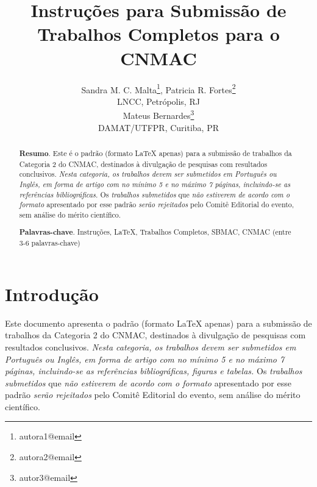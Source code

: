 \documentclass{pssbmac}
\begin{document}

\title{Instruções para Submissão de Trabalhos Completos para o CNMAC}

\author{
    {\large Sandra M. C. Malta}\thanks{autora1@email}, {\large Patricia R. Fortes}\thanks{autora2@email}\\
    {\small LNCC, Petrópolis, RJ} \\
    {\large Mateus Bernardes}\thanks{autor3@email}  \\
    {\small DAMAT/UTFPR, Curitiba, PR} \\
}
\criartitulo



\begin{abstract}
{\bf Resumo}. Este é o padrão (formato \LaTeX{} apenas) para a submissão de trabalhos da Categoria 2 do CNMAC, destinados à divulgação de pesquisas com resultados conclusivos. \emph{Nesta categoria, os trabalhos devem ser submetidos em Português ou Inglês, em forma de artigo com no mínimo 5 e no máximo 7 páginas, incluindo-se as referências bibliográficas.} Os \emph{trabalhos submetidos} que \emph{não estiverem de acordo com o formato} apresentado por esse padrão \emph{serão rejeitados} pelo Comitê Editorial do evento, sem análise do mérito científico.  

\noindent
{\bf Palavras-chave}. Instruções, \LaTeX, Trabalhos Completos, SBMAC, CNMAC  (entre 3-6 palavras-chave)
\end{abstract}

\section{Introdução}

Este documento apresenta o padrão (formato \LaTeX{} apenas) para a submissão de trabalhos da Categoria 2 do CNMAC, destinados à divulgação de pesquisas com resultados conclusivos. \emph{Nesta categoria, os trabalhos devem ser submetidos em Português ou Inglês, em forma de artigo com no mínimo 5 e no máximo 7 páginas, incluindo-se as referências bibliográficas, figuras e tabelas.} Os \emph{trabalhos submetidos} que \emph{não estiverem de acordo com o formato} apresentado por esse padrão \emph{serão rejeitados} pelo Comitê Editorial do evento, sem análise do mérito científico.
\end{document}
